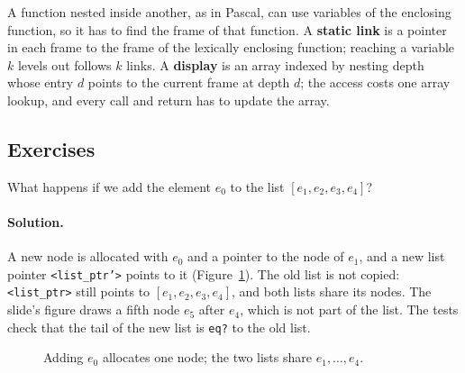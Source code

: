 A function nested inside another, as in Pascal, can use variables of the
enclosing function, so it has to find the frame of that function. A
\textbf{static link} is a pointer in each frame to the frame of the lexically
enclosing function; reaching a variable $k$ levels out follows $k$ links. A
\textbf{display} is an array indexed by nesting depth whose entry $d$ points to
the current frame at depth $d$; the access costs one array lookup, and every
call and return has to update the array.

\subsection{Exercises}

\begin{exercise}
What happens if we add the element $e_0$ to the list $[e_1, e_2, e_3, e_4]$?
\end{exercise}

\paragraph{Solution.} A new node is allocated with $e_0$ and a pointer to the node of
$e_1$, and a new list pointer \texttt{<list\_ptr'>} points to it
(Figure~\ref{fig:cons}). The old list is not copied: \texttt{<list\_ptr>} still
points to $[e_1, e_2, e_3, e_4]$, and both lists share its nodes. The slide's
figure draws a fifth node $e_5$ after $e_4$, which is not part of the list.
The tests check that the tail of the new list is \texttt{eq?} to the old list.

\begin{figure}[h]
\centering
{}
\caption{Adding $e_0$ allocates one node; the two lists share $e_1, \dots, e_4$.}
\label{fig:cons}
\end{figure}

